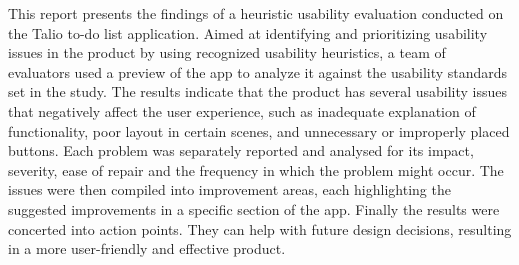 This report presents the findings of a heuristic usability evaluation conducted on the Talio to-do list application. Aimed at identifying and prioritizing usability issues in the product by using recognized usability heuristics, a team of evaluators used a preview of the app to analyze it against the usability standards set in the study. The results indicate that the product has several usability issues that negatively affect the user experience, such as inadequate explanation of functionality, poor layout in certain scenes, and unnecessary or improperly placed buttons. Each problem was separately reported and analysed for its impact, severity, ease of repair and the frequency in which the problem might occur. The issues were then compiled into improvement areas, each highlighting the suggested improvements in a specific section of the app. Finally the results were concerted into action points. They can help with future design decisions, resulting in a more user-friendly and effective product.